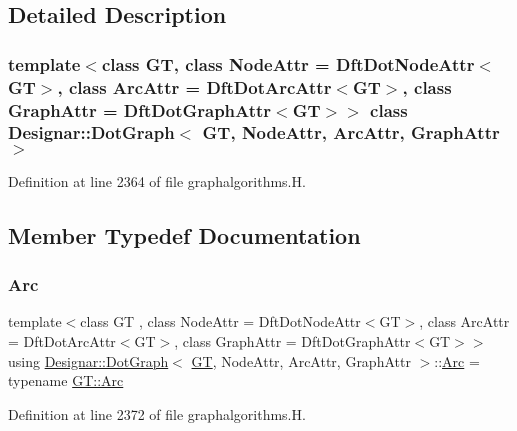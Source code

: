 \subsection{Detailed Description}
\subsubsection*{template$<$class GT, class Node\+Attr = Dft\+Dot\+Node\+Attr$<$\+G\+T$>$, class Arc\+Attr = Dft\+Dot\+Arc\+Attr$<$\+G\+T$>$, class Graph\+Attr = Dft\+Dot\+Graph\+Attr$<$\+G\+T$>$$>$\newline
class Designar\+::\+Dot\+Graph$<$ G\+T, Node\+Attr, Arc\+Attr, Graph\+Attr $>$}



Definition at line 2364 of file graphalgorithms.\+H.



\subsection{Member Typedef Documentation}
\mbox{\label{class_designar_1_1_dot_graph_a72979d4373928269dc67fb369548701d}} 
\subsubsection{\texorpdfstring{Arc}{Arc}}
{\footnotesize\ttfamily template$<$class GT , class Node\+Attr  = Dft\+Dot\+Node\+Attr$<$\+G\+T$>$, class Arc\+Attr  = Dft\+Dot\+Arc\+Attr$<$\+G\+T$>$, class Graph\+Attr  = Dft\+Dot\+Graph\+Attr$<$\+G\+T$>$$>$ \\
using \hyperlink{class_designar_1_1_dot_graph}{Designar\+::\+Dot\+Graph}$<$ \hyperlink{demo-buildgraph_8_c_a3001c40d2c31ca87ed96cd7d1334a55e}{GT}, Node\+Attr, Arc\+Attr, Graph\+Attr $>$\+::\hyperlink{class_designar_1_1_dot_graph_a72979d4373928269dc67fb369548701d}{Arc} =  typename \hyperlink{class_designar_1_1_graph_a74c730ef4ce2d20f998d72bd25c2b5bf}{G\+T\+::\+Arc}}



Definition at line 2372 of file graphalgorithms.\+H.

\mbox{\label{class_designar_1_1_dot_graph_a591d14a84a622be5bdcc190543c8ca46}} 
